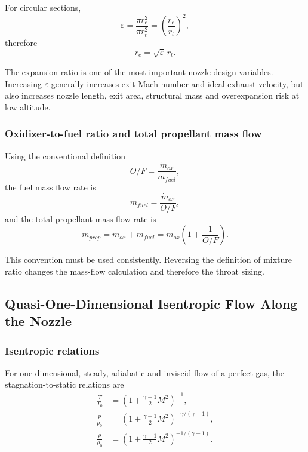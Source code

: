 \documentclass[journal,article,submit,oneauthor]{Definitions/mdpi}
\begin{document}
For circular sections,
\begin{equation}
\varepsilon=\frac{\pi r_e^2}{\pi r_t^2}=\left(\frac{r_e}{r_t}\right)^2,
\end{equation}
therefore
\begin{equation}
r_e=\sqrt{\varepsilon}\,r_t .
\label{eq:exit_radius}
\end{equation}

The expansion ratio is one of the most important nozzle design variables. Increasing $\varepsilon$ generally increases exit Mach number and ideal exhaust velocity, but also increases nozzle length, exit area, structural mass and overexpansion risk at low altitude.

\subsubsection{Oxidizer-to-fuel ratio and total propellant mass flow}

Using the conventional definition
\begin{equation}
O/F=\frac{\dot{m}_{ox}}{\dot{m}_{fuel}},
\end{equation}
the fuel mass flow rate is
\begin{equation}
\dot{m}_{fuel}=\frac{\dot{m}_{ox}}{O/F},
\end{equation}
and the total propellant mass flow rate is
\begin{equation}
\dot{m}_{prop}=\dot{m}_{ox}+\dot{m}_{fuel}
=\dot{m}_{ox}\left(1+\frac{1}{O/F}\right).
\label{eq:mdot_total}
\end{equation}

This convention must be used consistently. Reversing the definition of mixture ratio changes the mass-flow calculation and therefore the throat sizing.

\subsection{Quasi-One-Dimensional Isentropic Flow Along the Nozzle}

\subsubsection{Isentropic relations}

For one-dimensional, steady, adiabatic and inviscid flow of a perfect gas, the stagnation-to-static relations are
\begin{align}
\frac{T}{T_0} &= \left(1+\frac{\gamma-1}{2}M^2\right)^{-1},
\label{eq:T_T0}\\
\frac{p}{p_0} &= \left(1+\frac{\gamma-1}{2}M^2\right)^{-\gamma/(\gamma-1)},
\label{eq:p_p0}\\
\frac{\rho}{\rho_0} &= \left(1+\frac{\gamma-1}{2}M^2\right)^{-1/(\gamma-1)}.
\label{eq:rho_rho0}
\end{align}
\end{document}
